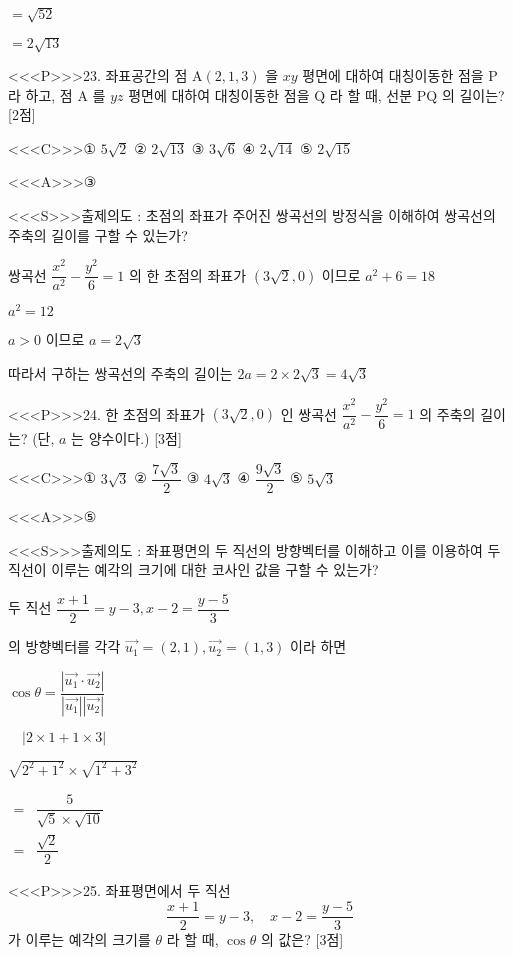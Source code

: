 \documentclass{oblivoir}
\begin{document}
$=\sqrt{52}$

$=2 \sqrt{13}$


<<<P>>>23. 좌표공간의 점 $\mathrm{A}(2,1,3)$ 을 $x y$ 평면에 대하여 대칭이동한 점을 $\mathrm{P}$ 라 하고, 점 $\mathrm{A}$ 를 $y z$ 평면에 대하여 대칭이동한 점을 $\mathrm{Q}$ 라 할 때, 선분 $\mathrm{PQ}$ 의 길이는? [2점]

<<<C>>>① $5 \sqrt{2}$
② $2 \sqrt{13}$
③ $3 \sqrt{6}$
④ $2 \sqrt{14}$
⑤ $2 \sqrt{15}$


<<<A>>>③

<<<S>>>출제의도 : 초점의 좌표가 주어진 쌍곡선의 방정식을 이해하여 쌍곡선의 주축의 길이를 구할 수 있는가?

쌍곡선 $\dfrac{x^{2}}{a^{2}}-\dfrac{y^{2}}{6}=1$ 의 한 초점의 좌표가
$(3 \sqrt{2}, 0)$ 이므로
$a^{2}+6=18$

$a^{2}=12$

$a>0$ 이므로
$a=2 \sqrt{3}$

따라서 구하는 쌍곡선의 주축의 길이는 $2 a=2 \times 2 \sqrt{3}=4 \sqrt{3}$


<<<P>>>24. 한 초점의 좌표가 $(3 \sqrt{2}, 0)$ 인 쌍곡선 $\dfrac{x^{2}}{a^{2}}-\dfrac{y^{2}}{6}=1$ 의 주축의 길이는? (단, $a$ 는 양수이다.) [3점]

<<<C>>>① $3 \sqrt{3}$
② $\dfrac{7 \sqrt{3}}{2}$
③ $4 \sqrt{3}$
④ $\dfrac{9 \sqrt{3}}{2}$
⑤ $5 \sqrt{3}$


<<<A>>>⑤

<<<S>>>출제의도 : 좌표평면의 두 직선의 방향벡터를 이해하고 이를 이용하여 두 직선이 이루는 예각의 크기에 대한 코사인 값을 구할 수 있는가?

두 직선
$\dfrac{x+1}{2}=y-3, x-2=\dfrac{y-5}{3}$

의 방향벡터를 각각
$\overrightarrow{u_{1}}=(2,1), \overrightarrow{u_{2}}=(1,3)$
이라 하면

$\cos \theta=\dfrac{\left|\overrightarrow{u_{1}} \cdot \overrightarrow{u_{2}}\right|}{\left|\overrightarrow{u_{1}}\right|\left|\overrightarrow{u_{2}}\right|}$

$\quad|2 \times 1+1 \times 3|$

$\sqrt{2^{2}+1^{2}} \times \sqrt{1^{2}+3^{2}}$

$\begin{aligned}=& \dfrac{5}{\sqrt{5} \times \sqrt{10}} \\=& \dfrac{\sqrt{2}}{2} \end{aligned}$



<<<P>>>25. 좌표평면에서 두 직선
$$
\dfrac{x+1}{2}=y-3, \quad x-2=\dfrac{y-5}{3}
$$
가 이루는 예각의 크기를 $\theta$ 라 할 때, $\cos \theta$ 의 값은? [3점]
\end{document}
